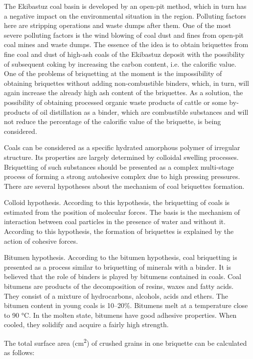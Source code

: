 \begin{multicols}{2}
The Ekibastuz coal basin is developed by an open-pit method, which in
turn has a negative impact on the environmental situation in the region.
Polluting factors here are stripping operations and waste dumps after
them. One of the most severe polluting factors is the wind blowing of
coal dust and fines from open-pit coal mines and waste dumps. The
essence of the idea is to obtain briquettes from fine coal and dust of
high-ash coals of the Ekibastuz deposit with the possibility of
subsequent coking by increasing the carbon content, i.e. the calorific
value. One of the problems of briquetting at the moment is the
impossibility of obtaining briquettes without adding non-combustible
binders, which, in turn, will again increase the already high ash
content of the briquettes. As a solution, the possibility of obtaining
processed organic waste products of cattle or some by-products of oil
distillation as a binder, which are combustible substances and will not
reduce the percentage of the calorific value of the briquette, is being
considered.

Coals can be considered as a specific hydrated amorphous polymer of
irregular structure. Its properties are largely determined by colloidal
swelling processes. Briquetting of such substances should be presented
as a complex multi-stage process of forming a strong autohesive complex
due to high pressing pressures. There are several hypotheses about the
mechanism of coal briquettes formation.

Colloid hypothesis. According to this hypothesis, the briquetting of
coals is estimated from the position of molecular forces. The basis is
the mechanism of interaction between coal particles in the presence of
water and without it. According to this hypothesis, the formation of
briquettes is explained by the action of cohesive forces.

Bitumen hypothesis. According to the bitumen hypothesis, coal
briquetting is presented as a process similar to briquetting of minerals
with a binder. It is believed that the role of binders is played by
bitumens contained in coals. Coal bitumens are products of the
decomposition of resins, waxes and fatty acids. They consist of a
mixture of hydrocarbons, alcohols, acids and ethers. The bitumen content
in young coals is 10--20\%. Bitumens melt at a temperature close to 90
°C. In the molten state, bitumens have good adhesive properties. When
cooled, they solidify and acquire a fairly high strength.

The total surface area (cm\textsuperscript{2}) of crushed grains in one
briquette can be calculated as follows:


\end{multicols}
